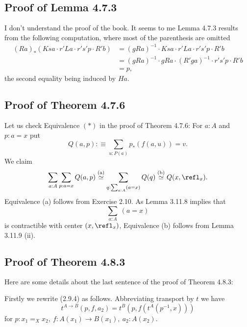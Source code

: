 \documentclass[12pt]{article}
\begin{document}


\subsection{Proof of Lemma 4.7.3}

I don't understand the proof of the book. It seems to me Lemma 4.7.3 results from the following computation, where most of the parenthesis are omitted
\begin{align*}
(Ra)_*(Ksa\cdot r'La\cdot r's'p\cdot R'b)
&=(gRa)^{-1}\cdot Ksa\cdot r'La\cdot r's'p\cdot R'b\\ 
&=(gRa)^{-1}\cdot gRa\cdot (R'ga)^{-1}\cdot r's'p\cdot R'b\\ 
&=p,
\end{align*} 
the second equality being induced by $Ha$.


\subsection{Proof of Theorem 4.7.6}

Let us check Equivalence $(*)$ in the proof of Theorem 4.7.6: For $a:A$ and $p:a=x$ put 
$$
Q(a,p):\equiv\sum_{u:P(a)}p_*(f(a,u))=v.
$$ 
We claim 
$$
\sum_{a:A}\sum_{p:a=x}Q(a,p)\overset{(\text a)}{\simeq}
\sum_{q:\sum_{a:A}(a=x)}Q(q)\overset{(\text b)}{\simeq}
Q(x,\refl_x).
$$
Equivalence (a) follows from Exercise 2.10. As Lemma 3.11.8 implies that $$\sum_{a:A}\ (a=x)$$ is contractible with center $(x,\refl_x)$, Equivalence (b) follows from Lemma 3.11.9 (ii). 


\subsection{Proof of Theorem 4.8.3}

Here are some details about the last sentence of the proof of Theorem 4.8.3:

Firstly we rewrite (2.9.4) as follows. Abbreviating transport by $t$ we have 
\begin{equation}\label{2.9.4}
t^{A\to B}(p,f,a_2)=t^B(p,f(t^A(p^{-1},x)))
\end{equation}
for $p:x_1=_Xx_2,\ f:A(x_1)\to B(x_1),\ a_2:A(x_2)$. 
\end{document}
